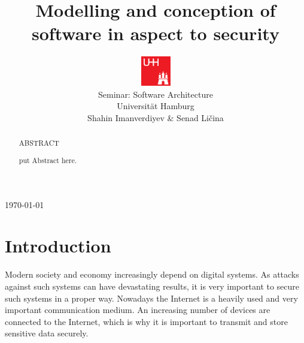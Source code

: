 \documentclass{acmtog} %
\begin{document}

\title{Modelling and conception of software in aspect to security} %

\author{
\parbox{4.2em}{\includegraphics[width=3.5em]{img/uhh}}%
\parbox{\textwidth}{
Seminar: Software Architecture \\
Universität Hamburg \\
Shahin Imanverdiyev \& Senad Ličina
}
}




\maketitle

\begin{bottomstuff}
\today
\end{bottomstuff}

\begin{abstract}
\begin{center}
ABSTRACT
\end{center}
put Abstract here.
\end{abstract}

\section{Introduction}

Modern society and economy increasingly depend on digital systems.
As attacks against such systems can have devastating results, it is very important to secure such systems in a proper way.
Nowadays the Internet is a heavily used and very important communication medium.
An increasing number of devices are connected to the Internet, which is why it is important to transmit and store sensitive data securely.
\end{document}

